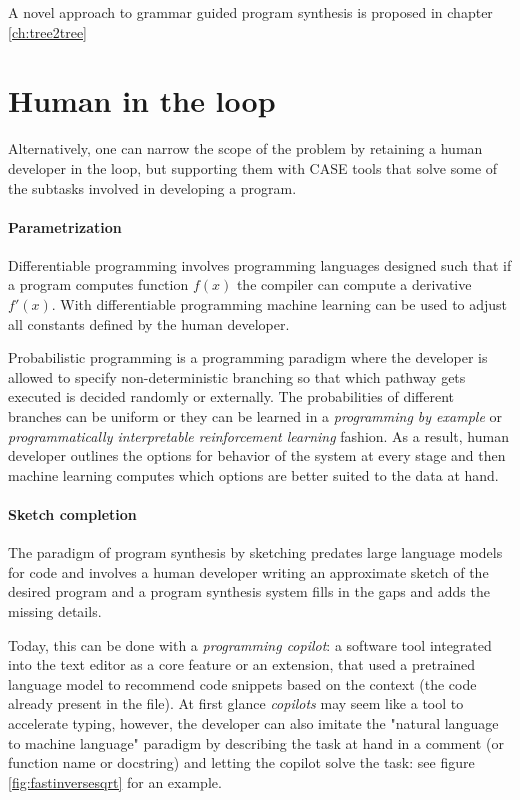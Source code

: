 A novel approach to grammar guided program synthesis is proposed in chapter \ref{ch:tree2tree}

\newpage
\section{Human in the loop}
\label{sec:human}

Alternatively, one can narrow the scope of the problem by retaining a human developer in the loop, but supporting them with CASE \cite{caseComputeraidedSoftwareEngineering1985} tools that solve some of the subtasks involved in developing a program.

\paragraph{Parametrization}

Differentiable programming \cite{blondelElementsDifferentiableProgramming2024} involves programming languages designed such that if a program computes function $f(x)$ the compiler can compute a derivative $f'(x)$. 
With differentiable programming machine learning can be used to adjust all constants defined by the human developer.

Probabilistic programming \cite{gordonProbabilisticProgramming2014} is a programming paradigm where the developer is allowed to specify non-deterministic branching so that which pathway gets executed is decided randomly or externally.
The probabilities of different branches can be uniform or they can be learned in a \emph{programming by example} or \emph{programmatically interpretable reinforcement learning} fashion.
As a result, human developer outlines the options for behavior of the system at every stage and then machine learning computes which options are better suited to the data at hand.


\paragraph{Sketch completion}

The paradigm of program synthesis by sketching predates large language models for code \cite{solar-lezamaProgramSynthesisSketching2008} and involves a human developer writing an approximate sketch of the desired program and a program synthesis system fills in the gaps and adds the missing details.

Today, this can be done with a \emph{programming copilot}: a software tool integrated into the text editor as a core feature or an extension, that used a pretrained language model to recommend code snippets based on the context (the code already present in the file).
At first glance \emph{copilots} may seem like a tool to accelerate typing, however, the developer can also imitate the "natural language to machine language" paradigm by describing the task at hand in a comment (or function name or docstring) and letting the copilot solve the task: see figure \ref{fig:fastinversesqrt} for an example.

